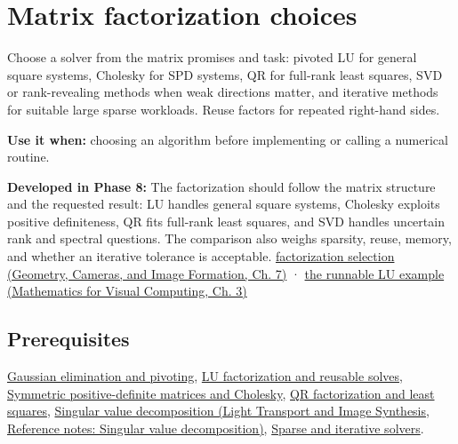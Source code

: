 \hypertarget{appendix-221a483bec2d}{}\label{referencestart:appendix-221a483bec2d}
\section{Matrix factorization choices}\label{appendix-221a483bec2d-matrix-factorization-choices}

\hypertarget{appendix-221a483bec2d-matrix-factorization-choices}{}

Choose a solver from the matrix promises and task: pivoted LU for general square systems, Cholesky for SPD systems, QR for full-rank least squares, SVD or rank-revealing methods when weak directions matter, and iterative methods for suitable large sparse workloads. Reuse factors for repeated right-hand sides.

\textbf{Use it when:} choosing an algorithm before implementing or calling a numerical routine.

\textbf{Developed in Phase 8:} The factorization should follow the matrix structure and the requested result: LU handles general square systems, Cholesky exploits positive definiteness, QR fits full-rank least squares, and SVD handles uncertain rank and spectral questions. The comparison also weighs sparsity, reuse, memory, and whether an iterative tolerance is acceptable. \href{../03-Geometry-Cameras-and-Image-Formation/main.pdf\#nameddest=02-foundations-ii-ch038-choose-a-factorization-from-structure-and-the-requested-answer}{factorization selection (Geometry, Cameras, and Image Formation, Ch. 7)} · \href{../02-Mathematics-for-Visual-Computing/main.pdf\#nameddest=01-foundations-i-ch019-a-runnable-pivoted-lu-reference-preserves-the-elimination-history}{the runnable LU example (Mathematics for Visual Computing, Ch. 3)}

\subsection{Prerequisites}\label{appendix-221a483bec2d-prerequisites}

\hypertarget{appendix-221a483bec2d-prerequisites}{}

\hyperref[appendix-f6e77f4a200f]{Gaussian elimination and pivoting}, \hyperref[appendix-55e4b5b0a1e6]{LU factorization and reusable solves}, \hyperref[appendix-50d2ea3c9b26]{Symmetric positive-definite matrices and Cholesky}, \hyperref[appendix-c3421e6b4f2c]{QR factorization and least squares}, \href{../04-Light-Transport-and-Image-Synthesis/main.pdf\#nameddest=appendix-1fad5e7f36fa}{Singular value decomposition (Light Transport and Image Synthesis, Reference notes: Singular value decomposition)}, \hyperref[appendix-67c87a3d9e94]{Sparse and iterative solvers}.


